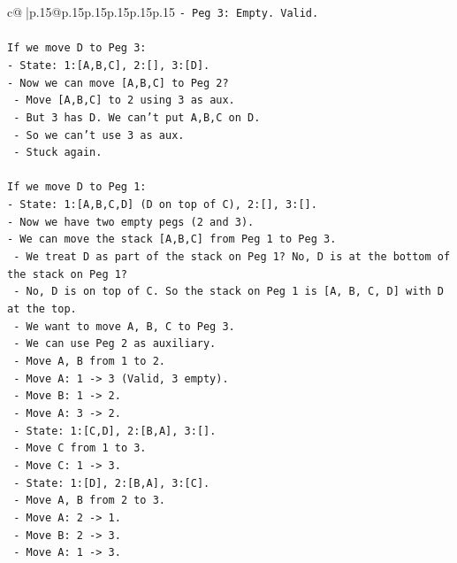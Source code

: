 \documentclass{article}
\begin{document}
{\begin{supertabular}{c@{$\;$}|p{.15\linewidth}@{}p{.15\linewidth}p{.15\linewidth}p{.15\linewidth}p{.15\linewidth}p{.15\linewidth}}
{{{\texttt{{-} Peg 3: Empty. Valid.} \\
\\ 
\texttt{If we move D to Peg 3:} \\
\texttt{{-} State: 1:{[}A,B,C{]}, 2:{[}{]}, 3:{[}D{]}.} \\
\texttt{{-} Now we can move {[}A,B,C{]} to Peg 2?} \\
\texttt{  {-} Move {[}A,B,C{]} to 2 using 3 as aux.} \\
\texttt{  {-} But 3 has D. We can't put A,B,C on D.} \\
\texttt{  {-} So we can't use 3 as aux.} \\
\texttt{  {-} Stuck again.} \\
\\ 
\texttt{If we move D to Peg 1:} \\
\texttt{{-} State: 1:{[}A,B,C,D{]} (D on top of C), 2:{[}{]}, 3:{[}{]}.} \\
\texttt{{-} Now we have two empty pegs (2 and 3).} \\
\texttt{{-} We can move the stack {[}A,B,C{]} from Peg 1 to Peg 3.} \\
\texttt{  {-} We treat D as part of the stack on Peg 1? No, D is at the bottom of the stack on Peg 1?} \\
\texttt{  {-} No, D is on top of C. So the stack on Peg 1 is {[}A, B, C, D{]} with D at the top.} \\
\texttt{  {-} We want to move A, B, C to Peg 3.} \\
\texttt{  {-} We can use Peg 2 as auxiliary.} \\
\texttt{  {-} Move A, B from 1 to 2.} \\
\texttt{    {-} Move A: 1 {-}> 3 (Valid, 3 empty).} \\
\texttt{    {-} Move B: 1 {-}> 2.} \\
\texttt{    {-} Move A: 3 {-}> 2.} \\
\texttt{    {-} State: 1:{[}C,D{]}, 2:{[}B,A{]}, 3:{[}{]}.} \\
\texttt{  {-} Move C from 1 to 3.} \\
\texttt{    {-} Move C: 1 {-}> 3.} \\
\texttt{    {-} State: 1:{[}D{]}, 2:{[}B,A{]}, 3:{[}C{]}.} \\
\texttt{  {-} Move A, B from 2 to 3.} \\
\texttt{    {-} Move A: 2 {-}> 1.} \\
\texttt{    {-} Move B: 2 {-}> 3.} \\
\texttt{    {-} Move A: 1 {-}> 3.} \\
}}}
\end{supertabular}}
\end{document}
